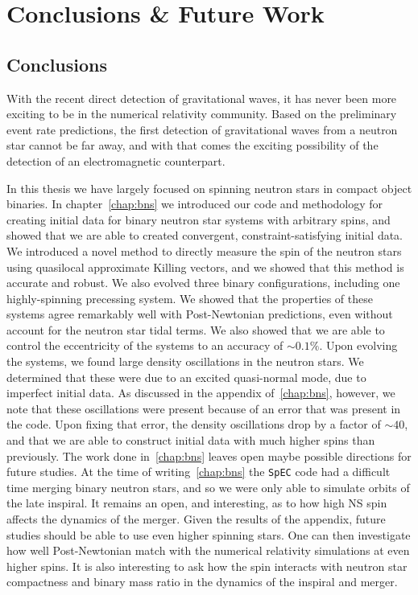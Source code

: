 \chapter{Conclusions \& Future Work}
\label{chap:conc}

\section{Conclusions}
With the recent direct detection of gravitational waves, it has never been more exciting to be in the numerical relativity community. Based on the preliminary event rate predictions, the first detection of gravitational waves from a neutron star cannot be far away, and with that comes the exciting possibility of the detection of an electromagnetic counterpart.

In this thesis we have largely focused on spinning neutron stars in compact object binaries. In chapter~\ref{chap:bns} we introduced our code and methodology for creating initial data for binary neutron star systems with arbitrary spins, and showed that we are able to created convergent, constraint-satisfying initial data. We introduced a novel method to directly measure the spin of the neutron stars using quasilocal approximate Killing vectors, and we showed that this method is accurate and robust. We also evolved three binary configurations, including one highly-spinning precessing system. We showed that the properties of these systems agree remarkably well with Post-Newtonian predictions, even without account for the neutron star tidal terms. We also showed that we are able to control the eccentricity of the systems to an accuracy of $\sim 0.1\%$. Upon evolving the systems, we found large density oscillations in the neutron stars. We determined that these were due to an excited quasi-normal mode, due to imperfect initial data. As discussed in the appendix of~\ref{chap:bns}, however, we note that these oscillations were present because of an error that was present in the code. Upon fixing that error, the density oscillations drop by a factor of $\sim 40$, and that we are able to construct initial data with much higher spins than previously. The work done in~\ref{chap:bns} leaves open maybe possible directions for future studies. At the time of writing~\ref{chap:bns} the {\tt SpEC} code had a difficult time merging binary neutron stars, and so we were only able to simulate orbits of the late inspiral. It remains an open, and interesting, as to how high NS spin affects the dynamics of the merger. Given the results of the appendix, future studies should be able to use even higher spinning stars. One can then investigate how well Post-Newtonian match with the numerical relativity simulations at even higher spins. It is also interesting to ask how the spin interacts with neutron star compactness and binary mass ratio in the dynamics of the inspiral and merger.

